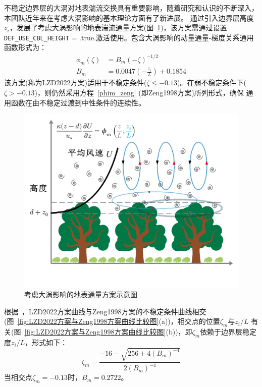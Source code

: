 不稳定边界层的大涡对地表湍流交换具有重要影响，随着研究和认识的不断深入，本团队近年来在考虑大涡影响的基本理论方面有了新进展。\citet{liu2019further,liu2022surface}
通过引入边界层高度$z_i$，发展了考虑大涡影响的地表湍流通量方案(图~\ref{fig:LZD2022方案概念图})，该方案需通过设置\texttt{DEF\_USE\_CBL\_HEIGHT} = .true.激活使用。包含大涡影响的动量通量-梯度关系通用函数形式为：
\begin{equation}
  \begin{aligned}
     \phi_{m}(\zeta) &= B_{m} (-\zeta)^{-1/2} \\[1ex]
     B_{m} &= 0.0047(-\frac{z_{i}}{L})+0.1854
  \end{aligned}
\end{equation}
该方案(称为LZD2022方案)适用于不稳定条件($\zeta \leqslant -0.13$)。在弱不稳定条件下($\zeta > -0.13$)，则仍然采用方程~\eqref{phim_zeng} (即Zeng1998方案)所列形式，确保
通用函数在由不稳定过渡到中性条件的连续性。
{
\begin{figure}[htbp]
\centering
\includegraphics[scale=0.7]{Figures/地表湍流交换过程/LZD2022方案概念图.png}
\caption{考虑大涡影响的地表通量方案示意图}
\label{fig:LZD2022方案概念图}
\end{figure}
}

根据~\citet{liu2023referenceheight}，LZD2022方案曲线与Zeng1998方案的不稳定条件曲线相交(图~\ref{fig:LZD2022方案与Zeng1998方案曲线比较图}(a))，相交点的位置$\zeta_{m}$与${z_{i}}/{L}$
有关(图~\ref{fig:LZD2022方案与Zeng1998方案曲线比较图}(b))，即$\zeta_{m}$依赖于边界层稳定度${z_{i}}/{L}$，形式如下：
\begin{equation}
     \zeta_{m}=\frac{-16-\sqrt{256+4 \left(B_{m}\right)^{-4}}}{2 \left(B_{m}\right)^{-4}}
\end{equation}
当相交点$\zeta_{m}=-0.13$时，$B_{m}=0.2722$。

